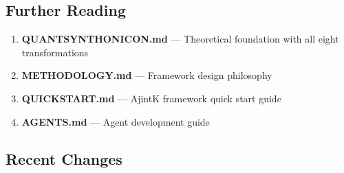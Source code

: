 \documentclass[12pt,a4paper]{article}
\begin{document}
\subsection{Further Reading}

\begin{enumerate}
    \item \textbf{QUANTSYNTHONICON.md} --- Theoretical foundation with all eight transformations
    \item \textbf{METHODOLOGY.md} --- Framework design philosophy
    \item \textbf{QUICKSTART.md} --- AjintK framework quick start guide
    \item \textbf{AGENTS.md} --- Agent development guide
\end{enumerate}

\subsection{Recent Changes}
\end{document}
